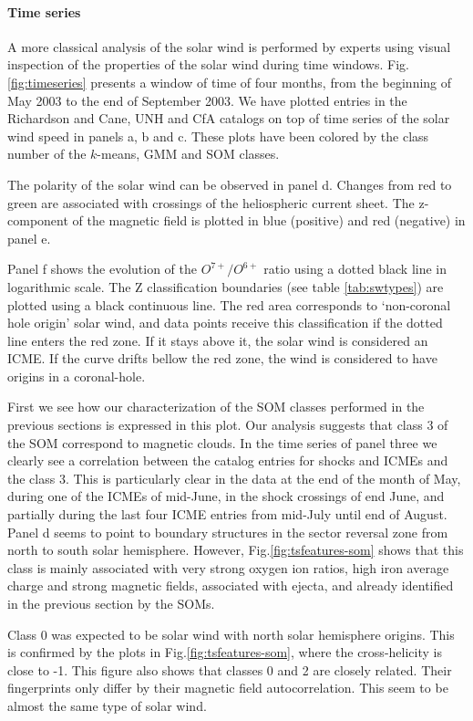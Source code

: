 \paragraph{Time series}
A more classical analysis of the solar wind is performed by experts using visual inspection of the properties of the solar wind during time windows. Fig.\ref{fig:timeseries} presents a window of time of four months, from the beginning of May 2003 to the end of September 2003. We have plotted entries in the Richardson and Cane, UNH and CfA catalogs on top of time series of the solar wind speed in panels a, b and c. These plots have been colored by the class number of the $k$-means, GMM and SOM classes.

The polarity of the solar wind can be observed in panel d. Changes from red to green are associated with crossings of the heliospheric current sheet. The z-component of the magnetic field is plotted in blue (positive) and red (negative) in panel e.

Panel f shows the evolution of the $O^{7+}/O^{6+}$ ratio using a dotted black line in logarithmic scale. The Z classification boundaries (see table \ref{tab:swtypes}) are plotted using a black continuous line. The red area corresponds to `non-coronal hole origin' solar wind, and data points receive this classification if the dotted line enters the red zone. If it stays above it, the solar wind is considered an ICME. If the curve drifts bellow the red zone, the wind is considered to have origins in a coronal-hole.

First we see how our characterization of the SOM classes performed in the previous sections is expressed in this plot. Our analysis suggests that class 3 of the SOM correspond to magnetic clouds. In the time series of panel three we clearly see a correlation between the catalog entries for shocks and ICMEs and the class 3. This is particularly clear in the data at the end of the month of May, during one of the ICMEs of mid-June, in the shock crossings of end June, and partially during the last four ICME entries from mid-July until end of August. Panel d seems to point to boundary structures in the sector reversal zone from north to south solar hemisphere. However, Fig.\ref{fig:tsfeatures-som} shows that this class is mainly associated with very strong oxygen ion ratios, high iron average charge and strong magnetic fields, associated with ejecta, and already identified in the previous section by the SOMs.

Class 0 was expected to be solar wind with north solar hemisphere origins. This is confirmed by the plots in Fig.\ref{fig:tsfeatures-som}, where the cross-helicity is close to -1. This figure also shows that classes 0 and 2 are closely related. Their fingerprints only differ by their magnetic field autocorrelation. This seem to be almost the same type of solar wind.

